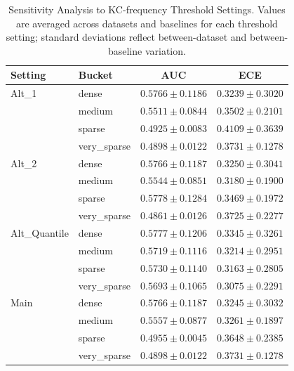 \begin{table}[htbp]
\caption{Sensitivity Analysis to KC-frequency Threshold Settings. Values are averaged across datasets and baselines for each threshold setting; standard deviations reflect between-dataset and between-baseline variation.}
\label{tab:sensitivity}
\centering

\scriptsize
\setlength{\tabcolsep}{3pt}
\begin{tabular}{llcc}
\toprule
Setting & Bucket & AUC & ECE \\
\midrule
Alt\_1 & dense & $0.5766 \pm 0.1186$ & $0.3239 \pm 0.3020$ \\
 & medium & $0.5511 \pm 0.0844$ & $0.3502 \pm 0.2101$ \\
 & sparse & $0.4925 \pm 0.0083$ & $0.4109 \pm 0.3639$ \\
 & very\_sparse & $0.4898 \pm 0.0122$ & $0.3731 \pm 0.1278$ \\
\midrule
Alt\_2 & dense & $0.5766 \pm 0.1187$ & $0.3250 \pm 0.3041$ \\
 & medium & $0.5544 \pm 0.0851$ & $0.3180 \pm 0.1900$ \\
 & sparse & $0.5778 \pm 0.1284$ & $0.3469 \pm 0.1972$ \\
 & very\_sparse & $0.4861 \pm 0.0126$ & $0.3725 \pm 0.2277$ \\
\midrule
Alt\_Quantile & dense & $0.5777 \pm 0.1206$ & $0.3345 \pm 0.3261$ \\
 & medium & $0.5719 \pm 0.1116$ & $0.3214 \pm 0.2951$ \\
 & sparse & $0.5730 \pm 0.1140$ & $0.3163 \pm 0.2805$ \\
 & very\_sparse & $0.5693 \pm 0.1065$ & $0.3075 \pm 0.2291$ \\
\midrule
Main & dense & $0.5766 \pm 0.1187$ & $0.3245 \pm 0.3032$ \\
 & medium & $0.5557 \pm 0.0877$ & $0.3261 \pm 0.1897$ \\
 & sparse & $0.4955 \pm 0.0045$ & $0.3648 \pm 0.2385$ \\
 & very\_sparse & $0.4898 \pm 0.0122$ & $0.3731 \pm 0.1278$ \\
\bottomrule
\end{tabular}
\end{table}
